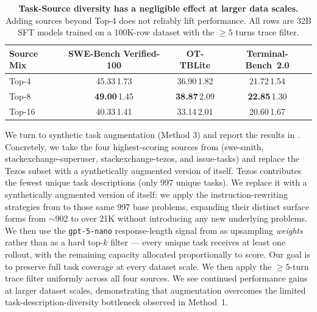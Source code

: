 \documentclass{llmxive}
\providecommand{\subscriptval}[1]{{\scriptsize #1}}
\begin{document}
\begin{table}[!t]
\centering
\small
\begin{tabular}{lccc}
\toprule
Source Mix & SWE-Bench Verified-100 & OT-TBLite & Terminal-Bench~2.0 \\
\midrule
Top-4  & 45.33\,\subscriptval{1.73} & 36.90\,\subscriptval{1.82} & 21.72\,\subscriptval{1.54} \\
Top-8  & \textbf{49.00}\,\subscriptval{1.45} & \textbf{38.87}\,\subscriptval{2.09} & \textbf{22.85}\,\subscriptval{1.30} \\
Top-16 & 40.33\,\subscriptval{1.41} & 33.14\,\subscriptval{2.01} & 20.60\,\subscriptval{1.67} \\
\bottomrule
\end{tabular}
\vspace{6pt}
\caption{ \textbf{Task-Source diversity has a negligible effect at larger data scales.} Adding sources beyond Top-4 does not reliably lift performance. All rows are 32B SFT models trained on a 100K-row dataset with the $\geq 5$ turns trace filter.}
\label{tab:top16_negative}
\end{table}
\FloatBarrier

We turn to synthetic task augmentation (Method 3) and report the results in . Concretely, we take the four highest-scoring sources from  (swe-smith, stackexchange-superuser, stackexchange-tezos, and issue-tasks) and replace the Tezos subset with a synthetically augmented version of itself. Tezos contributes the fewest unique task descriptions (only 997 unique tasks). We replace it with a synthetically augmented version of itself: we apply the instruction-rewriting strategies from   to those same 997 base problems, expanding their distinct surface forms from $\sim$902 to over 21K without introducing any new underlying problems. We then use the \texttt{gpt-5-nano} response-length signal from  as upsampling \emph{weights} rather than as a hard top-$k$ filter — every unique task receives at least one rollout, with the remaining capacity allocated proportionally to score. Our goal is to preserve full task coverage at every dataset scale. We then apply the $\geq 5$-turn trace filter uniformly across all four sources. We see continued performance gains at larger dataset scales, demonstrating that augmentation overcomes the limited task-description-diversity bottleneck observed in Method~1.

\FloatBarrier
\end{document}

